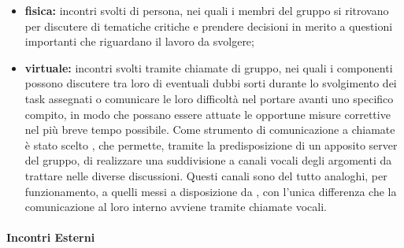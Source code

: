 				\begin{itemize}
					\item \textbf{fisica:} incontri svolti di persona, nei quali i membri del gruppo si ritrovano per discutere di tematiche critiche e prendere decisioni in merito a questioni importanti che riguardano il lavoro da svolgere;
					\item \textbf{virtuale:} incontri svolti tramite chiamate di gruppo, nei quali i componenti possono discutere tra loro di eventuali dubbi sorti durante lo svolgimento dei task assegnati o comunicare le loro difficoltà nel portare avanti uno specifico compito, in modo che possano essere attuate le opportune misure correttive nel più breve tempo possibile.
					\newline
					Come strumento di comunicazione a chiamate è stato scelto , che permette, tramite la predisposizione di un apposito server del gruppo, di realizzare una suddivisione a canali vocali degli argomenti da trattare nelle diverse discussioni. Questi canali sono del tutto analoghi, per funzionamento, a quelli messi a disposizione da , con l'unica differenza che la comunicazione al loro interno avviene tramite chiamate vocali.
				\end{itemize}

			\paragraph{Incontri Esterni}


